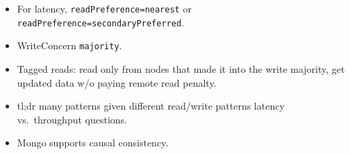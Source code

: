 \documentclass[xcolor=dvipsnames, 9pt]{beamer}
\begin{document}
\begin{frame}
\begin{columns}
        \begin{column}{0.5\textwidth}
            \begin{itemize}
                \item For latency, {\tiny \texttt{readPreference=nearest}} or
                    {\tiny \texttt{readPreference=secondaryPreferred}}.
                \item WriteConcern \texttt{majority}.
                \item Tagged reads: read only from nodes that made it into the
                    write majority, get updated data w/o paying remote read
                    penalty.
                \item tl;dr many patterns given different read/write patterns
                    latency vs.\ throughput questions.
                \item Mongo supports causal consistency.
            \end{itemize}
        \end{column}
    \end{columns}
\end{frame}
\end{document}

